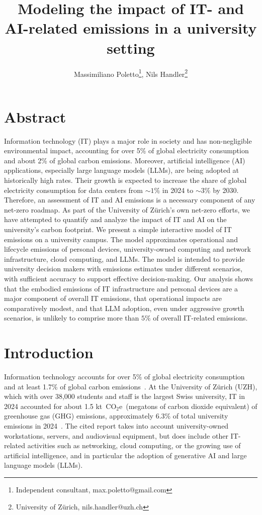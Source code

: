 \documentclass[11pt]{article}
\title{Modeling the impact of IT- and AI-related emissions in a university setting}
\author{Massimiliano Poletto\thanks{Independent consultant, max.poletto@gmail.com}, Nils Handler\thanks{University of Zürich, nils.handler@uzh.ch}}
\newcommand{\coe}{CO$_2$e}
\newcommand{\tcoe}{t~\coe}
\let\cite\parencite
\begin{document}
\maketitle

\section*{Abstract}
Information technology (IT) plays a major role in society and has non-negligible environmental impact, accounting for over 5\% of global electricity consumption and about 2\% of global carbon emissions. Moreover, artificial intelligence (AI) applications, especially large language models (LLMs), are being adopted at historically high rates. Their growth is expected to increase the share of global electricity consumption for data centers from $\sim 1\%$ in 2024 to $\sim 3\%$ by 2030. Therefore, an assessment of IT and AI emissions is a necessary component of any net-zero roadmap. As part of the University of Zürich's own net-zero efforts, we have attempted to quantify and analyze the impact of IT and AI on the university's carbon footprint. We present a simple interactive model of IT emissions on a university campus. The model approximates operational and lifecycle emissions of personal devices, university-owned computing and network infrastructure, cloud computing, and LLMs. The model is intended to provide university decision makers with emissions estimates under different scenarios, with sufficient accuracy to support effective decision-making. Our analysis shows that the embodied emissions of IT infrastructure and personal devices are a major component of overall IT emissions, that operational impacts are comparatively modest, and that LLM adoption, even under aggressive growth scenarios, is unlikely to comprise more than $5\%$ of overall IT-related emissions.

\section{Introduction}

Information technology accounts for over 5\% of global electricity consumption and at least 1.7\% of global carbon emissions~\cite{wb:itu:ict}. At the University of Zürich (UZH), which with over 38,000 students and staff is the largest Swiss university, IT in 2024 accounted for about 1.5 k\tcoe\ (megatons of carbon dioxide equivalent) of greenhouse gas (GHG) emissions, approximately 6.3\% of total university emissions in 2024~\cite{uzh:sustainability:report}. The cited report takes into account university-owned workstations, servers, and audiovisual equipment, but does include other IT-related activities such as networking, cloud computing, or the growing use of artificial intelligence, and in particular the adoption of generative AI and large language models (LLMs).
\end{document}
